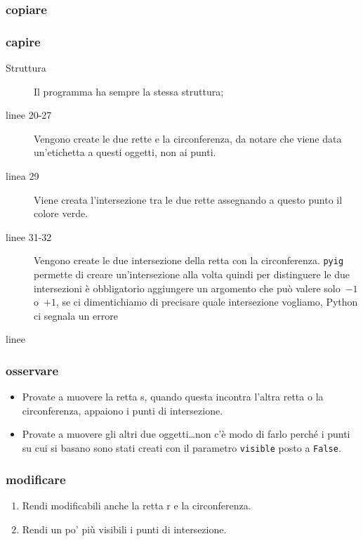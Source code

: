 \subsubsection{copiare}



\subsubsection{capire}

\begin{description}
 \item [Struttura] 
 Il programma ha sempre la stessa struttura;
 \item [linee 20-27]
Vengono create le due rette e la circonferenza, da notare che viene data 
un'etichetta a questi oggetti, non ai punti.
 \item [linea 29]
Viene creata l'intersezione tra le due rette assegnando a questo punto il 
colore verde.
 \item [linee 31-32]
Vengono create le due intersezione della retta con la circonferenza. 
\lstinline{pyig} permette di creare un'intersezione alla volta quindi per 
distinguere le due intersezioni è obbligatorio aggiungere un argomento che 
può 
valere solo~\(-1\) o~\(+1\), se ci dimentichiamo di precisare quale 
intersezione vogliamo, Python ci segnala un errore
 \item [linee ]
\end{description}

\subsubsection{osservare}

\begin{itemize}
\item Provate a muovere la retta s, quando questa incontra l'altra retta o la 
circonferenza, appaiono i punti di intersezione.
\item Provate a muovere gli altri due oggetti\dots non c'è modo di farlo 
perché i punti su cui si basano sono stati creati con il parametro 
\lstinline{visible} 
posto a \lstinline{False}.
\end{itemize}

\subsubsection{modificare}

\begin{enumerate} [noitemsep]
 \item Rendi modificabili anche la retta r e la circonferenza.
 \item Rendi un po' più visibili i punti di intersezione.
\end{enumerate}

